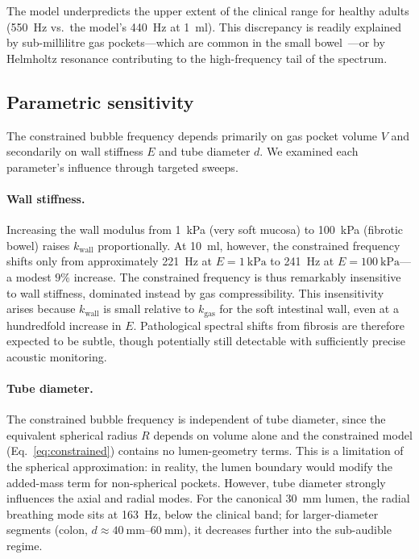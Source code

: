 \documentclass[12pt]{article}
\begin{document}
The model underpredicts the upper extent of the clinical range for healthy
adults (\SI{550}{\hertz} vs.\ the model's \SI{440}{\hertz} at
\SI{1}{\milli\litre}).  This discrepancy is readily explained by sub-millilitre
gas pockets---which are common in the small bowel~\cite{Levitt1971}---or by
Helmholtz resonance contributing to the high-frequency tail of the spectrum.

\subsection{Parametric sensitivity}
\label{sec:sensitivity}

The constrained bubble frequency depends primarily on gas pocket volume $V$
and secondarily on wall stiffness $E$ and tube diameter $d$.  We examined
each parameter's influence through targeted sweeps.

\paragraph{Wall stiffness.}
Increasing the wall modulus from \SI{1}{\kilo\pascal} (very soft mucosa) to
\SI{100}{\kilo\pascal} (fibrotic bowel) raises $k_\mathrm{wall}$
proportionally.  At \SI{10}{\milli\litre}, however, the constrained frequency
shifts only from approximately \SI{221}{\hertz} at $E = \SI{1}{\kilo\pascal}$
to \SI{241}{\hertz} at $E = \SI{100}{\kilo\pascal}$---a modest $9\%$ increase.
The constrained frequency is thus remarkably insensitive to wall stiffness,
dominated instead by gas compressibility.  This insensitivity arises because
$k_\mathrm{wall}$ is small relative to $k_\mathrm{gas}$ for the soft
intestinal wall, even at a hundredfold increase in $E$.  Pathological spectral
shifts from fibrosis are therefore expected to be subtle, though potentially
still detectable with sufficiently precise acoustic monitoring.

\paragraph{Tube diameter.}
The constrained bubble frequency is independent of tube diameter, since
the equivalent spherical radius $R$ depends on volume alone and the
constrained model (Eq.~\ref{eq:constrained}) contains no lumen-geometry
terms.  This is a limitation of the spherical approximation: in reality,
the lumen boundary would modify the added-mass term for non-spherical
pockets.  However, tube
diameter strongly influences the axial and radial modes.  For the canonical
\SI{30}{\milli\metre} lumen, the radial breathing mode sits at
\SI{163}{\hertz}, below the clinical band; for larger-diameter segments
(colon, $d \approx \SIrange{40}{60}{\milli\metre}$), it decreases further
into the sub-audible regime.
\end{document}
